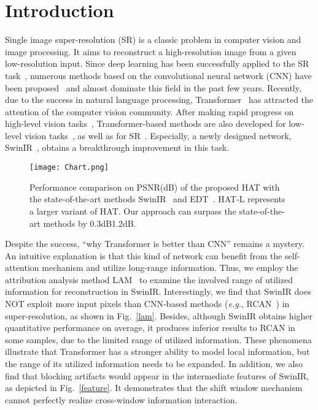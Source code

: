 \documentclass[10pt,twocolumn,letterpaper]{article}
\begin{document}
\vspace{-10pt}
\section{Introduction}
Single image super-resolution (SR) is a classic problem in computer vision and image processing. It aims to reconstruct a high-resolution image from a given low-resolution input. Since deep learning has been successfully applied to the SR task~\cite{srcnn_eccv}, numerous methods based on the convolutional neural network (CNN) have been proposed~\cite{srcnn_tpami,fsrcnn,edsr,rcan,rdn,san,classsr,bsrn} and almost dominate this field in the past few years. 
Recently, due to the success in natural language processing, Transformer~\cite{transformer} has attracted the attention of the computer vision community. After making rapid progress on high-level vision tasks~\cite{vit,swin_t,pvt}, Transformer-based methods are also developed for low-level vision tasks~\cite{ipt,uformer,restormer}, as well as for SR~\cite{edt,swinir}. Especially, a newly designed network, SwinIR~\cite{swinir}, obtains a breakthrough improvement in this task. 

\begin{figure}[!t]
\vspace{-0.1cm}
\centering
\texttt{[image: Chart.png]}
\vspace{-0.6cm}
\caption{Performance comparison on PSNR(dB) of the proposed HAT with the state-of-the-art methods SwinIR~\cite{swinir} and EDT~\cite{edt}. HAT-L represents a larger variant of HAT. Our approach can surpass the state-of-the-art methods by 0.3dB1.2dB.}
\vspace{-0.6cm}
\label{performance}
\end{figure}

Despite the success, ``why Transformer is better than CNN'' remains a mystery. An intuitive explanation is that this kind of network can benefit from the self-attention mechanism and utilize long-range information. 
Thus, we employ the attribution analysis method LAM~\cite{lam} to examine the involved range of utilized information for reconstruction in SwinIR. Interestingly, we find that SwinIR does NOT exploit more input pixels than CNN-based methods (\textit{e.g.}, RCAN~\cite{rcan}) in super-resolution, as shown in Fig.~\ref{lam}.
Besides, although SwinIR obtains higher quantitative performance on average, it produces inferior results to RCAN in some samples, due to the limited range of utilized information. 
These phenomena illustrate that Transformer has a stronger ability to model local information, but the range of its utilized information needs to be expanded.
In addition, we also find that blocking artifacts would appear in the intermediate features of SwinIR, as depicted in Fig.~\ref{feature}. It demonstrates that the shift window mechanism cannot perfectly realize cross-window information interaction. 
\end{document}
